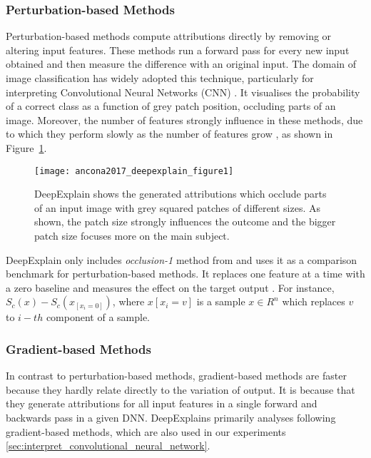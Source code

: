 \documentclass[english]{tktltiki2}
\theoremstyle{definition}
\theoremstyle{remark}
\begin{document}

\subsubsection{Perturbation-based Methods} %
Perturbation-based methods compute attributions directly by removing or altering input features. These methods run a forward pass for every new input obtained and then measure the difference with an original input. The domain of image classification has widely adopted this technique, particularly for interpreting Convolutional Neural Networks (CNN) \citep{zeiler2014visualizing}. It visualises the probability of a correct class as a function of grey patch position, occluding parts of an image. Moreover, the number of features strongly influence in these methods, due to which they perform slowly as the number of features grow \citep{zintgraf2017visualizing}, as shown in Figure~\ref{fig:ancona2017_deepexplain_figure1}.

\begin{figure}[H]
	\texttt{[image: ancona2017\_deepexplain\_figure1]}
	\vspace*{-8mm}
	\caption{DeepExplain \citep{ancona2017towards} shows the generated attributions which occlude parts of an input image with grey squared patches of different sizes. As shown, the patch size strongly influences the outcome and the bigger patch size focuses more on the main subject.}
	\label{fig:ancona2017_deepexplain_figure1}
\end{figure}

DeepExplain only includes \textit{occlusion-1} method from \citep{zeiler2014visualizing} and uses it as a comparison benchmark for perturbation-based methods. It replaces one feature at a time with a zero baseline and measures the effect on the target output \citep{ancona2017towards}. For instance, $S_{c}(x) - S_{c}(x_{[x_i=0]})$, where $x[x_i=v]$ is a sample $x \in R^n$  which replaces $v$ to $i-th$ component of a sample.

\subsubsection{Gradient-based Methods} %
In contrast to perturbation-based methods, gradient-based methods are faster because they hardly relate directly to the variation of output. It is because that they generate attributions for all input features in a single forward and backwards pass in a given DNN. DeepExplains primarily analyses following gradient-based methods, which are also used in our experiments \ref{sec:interpret_convolutional_neural_network}.
\end{document}
